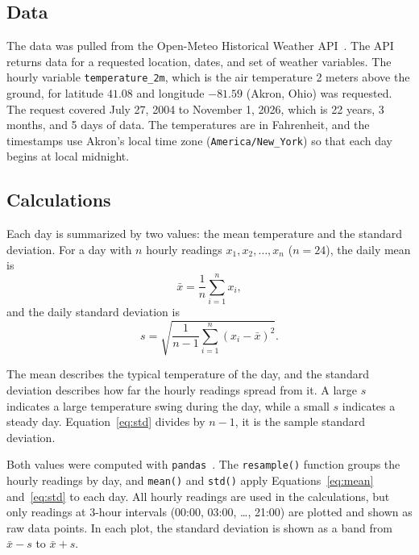 \subsection{Data}

The data was pulled from the Open-Meteo Historical Weather API~\cite{metro}. The API returns data for a requested location, dates, and set of weather variables. The hourly variable \texttt{temperature\_2m}, which is the air temperature 2 meters above the ground, for latitude $41.08$ and longitude $-81.59$ (Akron, Ohio) was requested. The request covered July 27, 2004 to November 1, 2026, which is 22 years, 3 months, and 5 days of data. The temperatures are in Fahrenheit, and the timestamps use Akron's local time zone (\texttt{America/New\_York}) so that each day begins at local midnight.

\subsection{Calculations}

Each day is summarized by two values: the mean temperature and the standard deviation. For a day with $n$ hourly readings $x_1, x_2, \dots, x_n$ ($n = 24$), the daily mean is
\begin{equation}
  \bar{x} = \frac{1}{n} \sum_{i=1}^{n} x_i ,
  \label{eq:mean}
\end{equation}
and the daily standard deviation is
\begin{equation}
  s = \sqrt{\frac{1}{n-1} \sum_{i=1}^{n} \left(x_i - \bar{x}\right)^2 } .
  \label{eq:std}
\end{equation}

The mean describes the typical temperature of the day, and the standard deviation describes how far the hourly readings spread from it. A large $s$ indicates a large temperature swing during the day, while a small $s$ indicates a steady day. Equation~\ref{eq:std} divides by $n-1$, it is the sample standard deviation.

Both values were computed with \texttt{pandas}~\cite{mckinney10:pandas}. The \texttt{resample()} function groups the hourly readings by day, and \texttt{mean()} and \texttt{std()} apply Equations~\ref{eq:mean} and~\ref{eq:std} to each day. All hourly readings are used in the calculations, but only readings at 3-hour intervals (00:00, 03:00, \dots, 21:00) are plotted and shown as raw data points. In each plot, the standard deviation is shown as a band from $\bar{x} - s$ to $\bar{x} + s$.